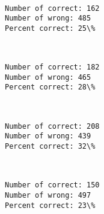 \documentclass[11pt]{article}
\begin{document}
    \begin{center}
    \end{center}
    { \hspace*{\fill} \\}
    
    \begin{Verbatim}[commandchars=\\\{\}]
Number of correct: 162
Number of wrong: 485
Percent correct: 25\%

    \end{Verbatim}

    \begin{center}
    \end{center}
    { \hspace*{\fill} \\}
    
    \begin{Verbatim}[commandchars=\\\{\}]
Number of correct: 182
Number of wrong: 465
Percent correct: 28\%

    \end{Verbatim}

    \begin{center}
    \end{center}
    { \hspace*{\fill} \\}
    
    \begin{Verbatim}[commandchars=\\\{\}]
Number of correct: 208
Number of wrong: 439
Percent correct: 32\%

    \end{Verbatim}

    \begin{center}
    \end{center}
    { \hspace*{\fill} \\}
    
    \begin{Verbatim}[commandchars=\\\{\}]
Number of correct: 150
Number of wrong: 497
Percent correct: 23\%

    \end{Verbatim}
\end{document}

